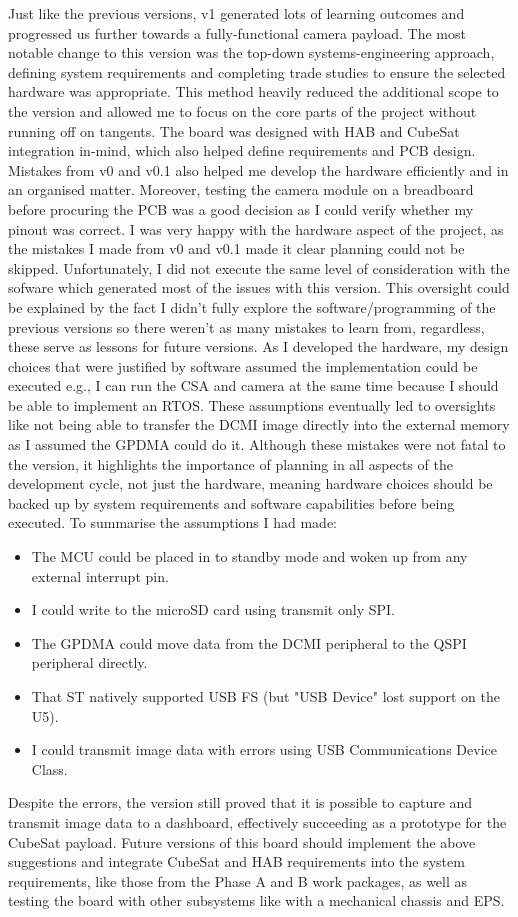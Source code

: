 Just like the previous versions, v1 generated lots of learning outcomes and progressed us further towards a fully-functional camera payload. The most notable change to this version was the top-down systems-engineering approach, defining system requirements and completing trade studies to ensure the selected hardware was appropriate. This method heavily reduced the additional scope to the version and allowed me to focus on the core parts of the project without running off on tangents. The board was designed with HAB and CubeSat integration in-mind, which also helped define requirements and PCB design. Mistakes from v0 and v0.1 also helped me develop the hardware efficiently and in an organised matter. Moreover, testing the camera module on a breadboard before procuring the PCB was a good decision as I could verify whether my pinout was correct. I was very happy with the hardware aspect of the project, as the mistakes I made from v0 and v0.1 made it clear planning could not be skipped. Unfortunately, I did not execute the same level of consideration with the sofware which generated most of the issues with this version. This oversight could be explained by the fact I didn't fully explore the software/programming of the previous versions so there weren't as many mistakes to learn from, regardless, these serve as lessons for future versions.
\nl
As I developed the hardware, my design choices that were justified by software assumed the implementation could be executed e.g., I can run the CSA and camera at the same time because I should be able to implement an RTOS. These assumptions eventually led to oversights like not being able to transfer the DCMI image directly into the external memory as I assumed the GPDMA could do it. Although these mistakes were not fatal to the version, it highlights the importance of planning in all aspects of the development cycle, not just the hardware, meaning hardware choices should be backed up by system requirements and software capabilities before being executed. To summarise the assumptions I had made:

\begin{itemize}
    \item The MCU could be placed in to standby mode and woken up from any external interrupt pin.
    \item I could write to the microSD card using transmit only SPI.
    \item The GPDMA could move data from the DCMI peripheral to the QSPI peripheral directly.
    \item That ST natively supported USB FS (but "USB Device" lost support on the U5).
    \item I could transmit image data with errors using USB Communications Device Class.
\end{itemize}

Despite the errors, the version still proved that it is possible to capture and transmit image data to a dashboard, effectively succeeding as a prototype for the CubeSat payload. Future versions of this board should implement the above suggestions and integrate CubeSat and HAB requirements into the system requirements, like those from the Phase A and B work packages, as well as testing the board with other subsystems like with a mechanical chassis and EPS.